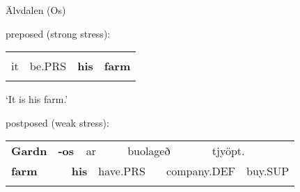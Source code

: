 \begin{listWWNumileveli}
\item {}

\begin{styleExample}
Älvdalen (Os)

\end{styleExample}

\end{listWWNumileveli}

\begin{listWWNumlxxxixleveli}
\item {}

\begin{styleExLtrTbl}
preposed (strong stress):

\end{styleExLtrTbl}

\end{listWWNumlxxxixleveli}

\begin{tabular}{llll}
\lsptoprule
\multicolumn{4}{l}{Eð

}\\
it & be.PRS & {\bfseries his} & {\bfseries farm}\\
\lspbottomrule
\end{tabular}

\begin{styleTranslation}
‘It is his farm.’

\end{styleTranslation}

\begin{styleExLtrTblii}
postposed (weak stress):

\end{styleExLtrTblii}

\begin{tabular}{llllllllll}
\lsptoprule
{\bfseries Gardn} & \multicolumn{2}{l}{{\bfseries {}-os}

} & \multicolumn{2}{l}{ar

} & \multicolumn{2}{l}{buolageð

} & \multicolumn{2}{l}{tjyöpt.

} & \\
\multicolumn{2}{l}{{\bfseries farm}

} & \multicolumn{2}{l}{{\bfseries his}

} & \multicolumn{2}{l}{have.PRS

} & \multicolumn{2}{l}{company.DEF

} & \multicolumn{2}{l}{buy.SUP

}\\
\lspbottomrule
\end{tabular}

